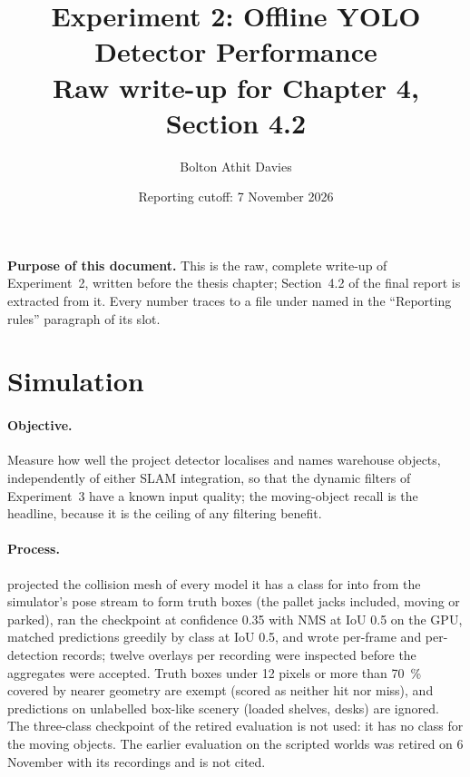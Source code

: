 \documentclass[11pt,a4paper,notitlepage]{report}
\title{Experiment 2: Offline YOLO Detector Performance\\
       \large Raw write-up for Chapter 4, Section 4.2}
\author{Bolton Athit Davies}
\date{Reporting cutoff: 7 November 2026}
\begin{document}
\maketitle

\noindent\textbf{Purpose of this document.} This is the raw, complete write-up
of Experiment~2, written before the thesis chapter; Section~4.2 of the final
report is extracted from it. Every number traces to a file under
 named in the ``Reporting rules'' paragraph of its slot.

\section{Simulation}
\label{sec:exp2-sim}


\paragraph{Objective.} Measure how well the project detector localises and
names warehouse objects, independently of either SLAM integration, so that
the dynamic filters of Experiment~3 have a known input quality; the
moving-object recall is the headline, because it is the ceiling of any
filtering benefit.

\paragraph{Process.}  projected the collision mesh of
every model it has a class for into  from the simulator's pose
stream to form truth boxes (the pallet jacks included, moving or parked), ran
the checkpoint at confidence 0.35 with NMS at IoU 0.5 on the GPU, matched
predictions greedily by class at IoU 0.5, and wrote per-frame and
per-detection records; twelve overlays per recording were inspected before
the aggregates were accepted. Truth boxes under 12 pixels or more than
\SI{70}{\percent} covered by nearer geometry are exempt (scored as neither hit
nor miss), and predictions on unlabelled box-like scenery (loaded shelves,
desks) are ignored. The three-class checkpoint of the retired evaluation is
not used: it has no class for the moving objects. The earlier evaluation on
the scripted worlds was retired on 6 November with its recordings and is not
cited.
\end{document}
